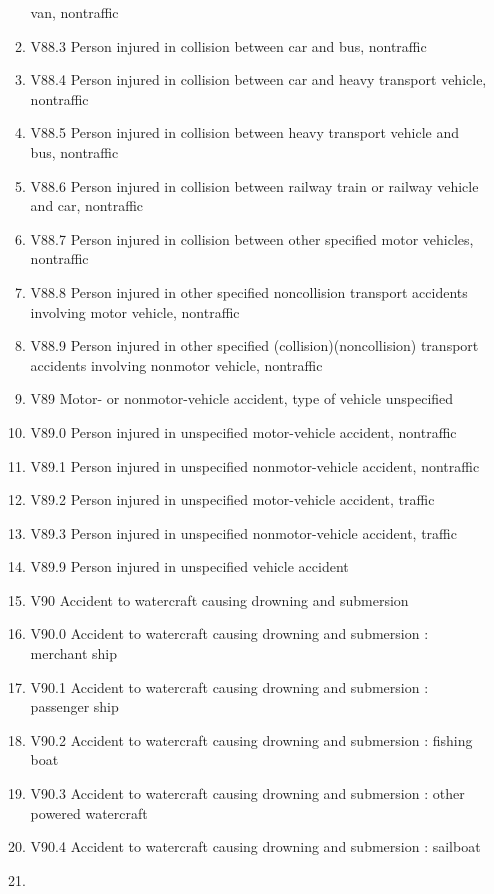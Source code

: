 \documentclass[
]{scrartcl}
\begin{document}
\begin{itemize}
\begin{enumerate}
    van, nontraffic
  \item
    V88.3 Person injured in collision between car and bus, nontraffic
  \item
    V88.4 Person injured in collision between car and heavy transport
    vehicle, nontraffic
  \item
    V88.5 Person injured in collision between heavy transport vehicle
    and bus, nontraffic
  \item
    V88.6 Person injured in collision between railway train or railway
    vehicle and car, nontraffic
  \item
    V88.7 Person injured in collision between other specified motor
    vehicles, nontraffic
  \item
    V88.8 Person injured in other specified noncollision transport
    accidents involving motor vehicle, nontraffic
  \item
    V88.9 Person injured in other specified (collision)(noncollision)
    transport accidents involving nonmotor vehicle, nontraffic
  \item
    V89 Motor- or nonmotor-vehicle accident, type of vehicle unspecified
  \item
    V89.0 Person injured in unspecified motor-vehicle accident,
    nontraffic
  \item
    V89.1 Person injured in unspecified nonmotor-vehicle accident,
    nontraffic
  \item
    V89.2 Person injured in unspecified motor-vehicle accident, traffic
  \item
    V89.3 Person injured in unspecified nonmotor-vehicle accident,
    traffic
  \item
    V89.9 Person injured in unspecified vehicle accident
  \item
    V90 Accident to watercraft causing drowning and submersion
  \item
    V90.0 Accident to watercraft causing drowning and submersion :
    merchant ship
  \item
    V90.1 Accident to watercraft causing drowning and submersion :
    passenger ship
  \item
    V90.2 Accident to watercraft causing drowning and submersion :
    fishing boat
  \item
    V90.3 Accident to watercraft causing drowning and submersion : other
    powered watercraft
  \item
    V90.4 Accident to watercraft causing drowning and submersion :
    sailboat
  \item

\end{enumerate}
\end{itemize}
\end{document}
